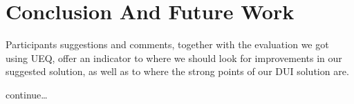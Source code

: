 \chapter{Conclusion And Future Work}\label{chapter:conc}
Participants suggestions and comments, together with the evaluation we got using
UEQ, offer an indicator to where we should look for improvements in our
suggested solution, as well as to where the strong points of our DUI
solution are.

continue\ldots